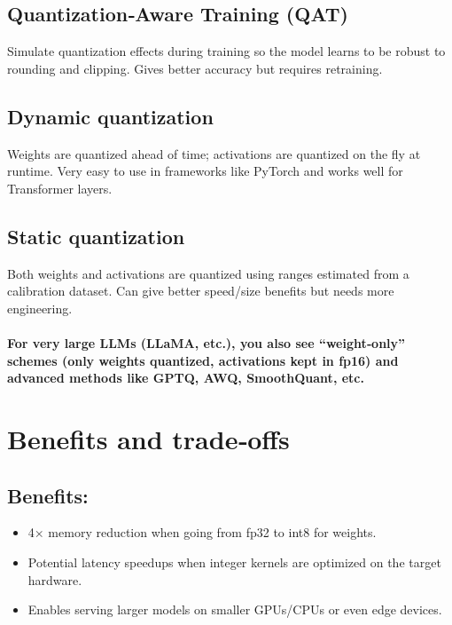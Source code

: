\documentclass{article}
\begin{document}
\subsection{Quantization‑Aware Training (QAT)}

\normalsize { 
Simulate quantization effects during training so the model learns to be robust to rounding and clipping.
Gives better accuracy but requires retraining.}

\subsection{Dynamic quantization}

\normalsize { 
Weights are quantized ahead of time; activations are quantized on the fly at runtime.
Very easy to use in frameworks like PyTorch and works well for Transformer layers.}


\subsection{Static quantization}

\normalsize { 
Both weights and activations are quantized using ranges estimated from a calibration dataset.
Can give better speed/size benefits but needs more engineering.

}



\paragraph{
For very large LLMs (LLaMA, etc.), you also see “weight‑only” schemes (only weights quantized, activations kept in fp16) and advanced methods like GPTQ, AWQ, SmoothQuant, etc.}



\section{Benefits and trade‑offs}

\subsection{Benefits:}

\begin{itemize}
    \item 4× memory reduction when going from fp32 to int8 for weights.
    \item Potential latency speedups when integer kernels are optimized on the target hardware.
    \item Enables serving larger models on smaller GPUs/CPUs or even edge devices.
\end{itemize} 
\end{document}

